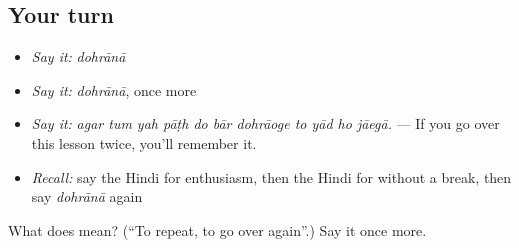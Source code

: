 \subsection*{Your turn}
\begin{itemize}
\raggedright
  \item \emph{Say it:} \emph{dohrānā}
  \item \emph{Say it:} \emph{dohrānā}, once more
  \item \emph{Say it:} \emph{agar tum yah pāṭh do bār dohrāoge to yād ho jāegā.} — If you go over this lesson twice, you'll remember it.
  \item \emph{Recall:} say the Hindi for enthusiasm, then the Hindi for without a break, then say \emph{dohrānā} again
\end{itemize}

\begin{tcolorbox}[breakable,colback=teal!4,colframe=teal!35!black,title={Before you move on}]
What does  mean? (\textquotedblleft{}To repeat, to go over again\textquotedblright{}.) Say it once more.
\end{tcolorbox}
